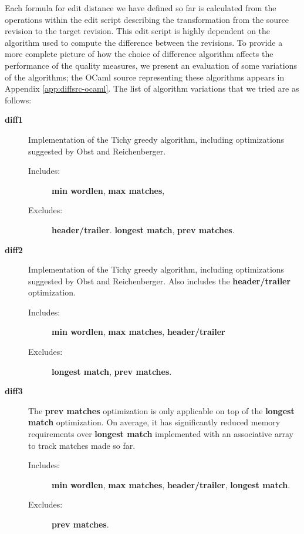Each formula for edit distance we have defined so far is calculated
from the operations within the edit script describing the transformation
from the source revision to the target revision.
This edit script is highly dependent on the algorithm used to
compute the difference between the revisions.
To provide a more complete picture of how the choice of difference
algorithm affects the performance of the quality measures,
we present an evaluation of some variations of the algorithms;
the OCaml source representing these algorithms appears
in Appendix \ref{app:diffsrc-ocaml}.
The list of algorithm variations that we tried are as follows:
%
\begin{description}

\item[\textbf{diff1}]
    Implementation of the Tichy greedy algorithm, including optimizations
    suggested by Obst and Reichenberger.
    \begin{description}
    \item[Includes:]
        \textbf{min wordlen}, \textbf{max matches},
    \item[Excludes:]
        \textbf{header/trailer}.
        \textbf{longest match}, \textbf{prev matches}.
    \end{description}

\item[\textbf{diff2}]
    Implementation of the Tichy greedy algorithm, including optimizations
    suggested by Obst and Reichenberger.  Also includes the
    \textbf{header/trailer} optimization.
    \begin{description}
    \item[Includes:]
        \textbf{min wordlen}, \textbf{max matches}, \textbf{header/trailer}
    \item[Excludes:]
        \textbf{longest match}, \textbf{prev matches}.
    \end{description}

\item[\textbf{diff3}]
    The \textbf{prev matches} optimization is only applicable
    on top of the \textbf{longest match} optimization.
    On average, it has significantly reduced memory requirements
    over \textbf{longest match} implemented with an associative array
    to track matches made so far.
    \begin{description}
    \item[Includes:]
	\textbf{min wordlen}, \textbf{max matches},
	\textbf{header/trailer}, \textbf{longest match}.
    \item[Excludes:]
	\textbf{prev matches}.
    \end{description}


\end{description}
